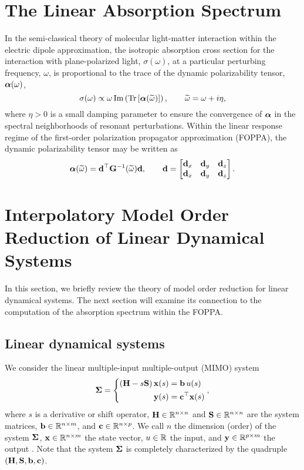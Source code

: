 \section{The Linear Absorption Spectrum}
In the semi-classical theory of molecular light-matter interaction within the electric dipole approximation, the isotropic absorption cross section for the interaction with plane-polarized light, $\sigma(\omega)$, at a particular perturbing frequency, $\omega$, is proportional to the trace of the dynamic polarizability tensor, $\boldsymbol{\alpha}(\omega)$,
\begin{equation}
  \sigma(\omega) \propto \omega \operatorname{Im}\left(\operatorname{Tr}\left[ \boldsymbol{\alpha}(\widetilde{\omega}) \right]\right), \qquad \widetilde{\omega} = \omega + i\eta,
  \label{eq:abs-spectrum}
\end{equation}
where $\eta > 0$ is a small damping parameter to ensure the convergence of $\boldsymbol{\alpha}$ in the spectral neighborhoods of resonant perturbations. Within the linear response regime of the first-order polarization propagator approximation (FOPPA)\cite{Yeager84_33}, the dynamic polarizability tensor may be written as
\begin{equation}
  \boldsymbol{\alpha}(\widetilde{\omega}) = \mathbf{d}^\top \mathbf{G}^{-1}(\widetilde{\omega}) \mathbf{d}, \qquad 
  \mathbf{d} = \begin{bmatrix}
    \mathbf{d}_x & \mathbf{d}_y & \mathbf{d}_z \\
    \mathbf{d}_x & \mathbf{d}_y & \mathbf{d}_z
  \end{bmatrix}.
  \label{eq:polar-tensor}
\end{equation}


\section{Interpolatory Model Order Reduction of Linear Dynamical Systems}
\label{lds:dyn-sys}

In this section, we briefly review the theory of model order reduction for
linear dynamical systems. The next section will examine its connection to the
computation of the absorption spectrum within the FOPPA.

\subsection{Linear dynamical systems}
\label{lds:mimo}

We consider the linear multiple-input multiple-output (MIMO) system
\begin{equation}
  \mathbf{\Sigma} = \left\{\begin{aligned}
    \left( \mathbf{H} - s\mathbf{S} \right) \mathbf{x}(s) &= \mathbf{b}\,u(s) \\
                              \mathbf{y}(s) &= \mathbf{c}^\top \mathbf{x}(s)
  \end{aligned}\right.,
  \label{eq:siso}
\end{equation}
where $s$ is a derivative or shift operator, $\bH \inRR{n}$ and $\bS \inRR{n}$ are the system matrices, $\bfb \inR[n][m]$, and $\bfc \inR[n][p]$. We call $n$ the dimension  (order) of the system $\mathbf{\Sigma}$, $\bfx \inR[n][m]$ the state vector, $u \inR$ the input, and $\bfy \inR[p][m]$ the output \cite{Antoulas2005}. Note that the system $\mathbf{\Sigma}$ is completely characterized by the quadruple $(\mathbf{H},\mathbf{S},\mathbf{b},\mathbf{c})$.

